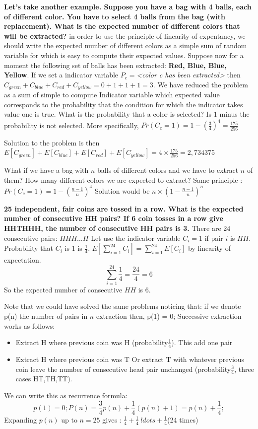 \begin{framed}
\begin{example}
\textbf{Let's take another example. Suppose you have a bag with 4 balls, each  of different color. You have to select 4 balls from the bag (with replacement). What is the expected number of different colors that will be extracted? }
in order to use the principle of linearity of expentancy, we should write the expected number of different colors as a simple sum of random variable for which is easy to compute their expected values.
Suppose now for a moment the following set of balls has been  extracted: \textbf{Red, Blue, Blue, Yellow}. If we set a indicator variable $P_c =$\textit{<color c has been extracted>} then $C_{green} + C_{blue} +C_{red} +C_{yellow} =   0 +1+1+1=3$. We have reduced the problem as a sum of simple to compute Indicator variable which expected value corresponds to the probability that the condition for which the indicator takes value one is true.
What is the probability that a color is selected? Is $1$ minus the probability is not selected.
More specifically, $Pr(C_c=1) = 1 - (\frac{3}{4})^4 = \frac{175}{256}$

Solution to the problem is then $E[C_{green}] + E[C_{blue}] +E[C_{red}] +E[C_{yellow}] = 4 \times \frac{175}{256}= 2,734375$

What if we have a bag with $n$ balls of different colors and we have to extract $n$ of them? How many different colors we are expected to extract?
Same principle : $Pr(C_c=1) = 1 - (\frac{n-1}{n})^4$
Solution would be $n \times (1-\frac{n-1}{n})^n$
\end{example}
\begin{example}
\textbf{25 independent, fair coins are tossed in a row. What is the expected number of consecutive HH pairs? If 6 coin tosses in a row give HHTHHH, the number of consecutive HH pairs is 3.}
There are 24 consecutive pairs: $HHH\ldots H$
Let use the indicator variable $C_i =1 $ if pair $i$ is $HH$. Probability that $C_i$ is $1$ is $\frac{1}{4}$.
$E[\sum_{i=1}^24 C_i] = \sum_{i=1}^24 E[C_i]$  by linearity of expectation.
\[
\sum_{i=1}^{24} \frac{1}{4} = \frac{24}{4} = 6
\]
So the expected number of consecutive $HH$ is 6.

Note that we could have solved the same problems noticing that:
if we denote p(n) the number of pairs in $n$ extraction then, p(1) = 0;
Successive extraction works as follows:

\begin{itemize}
	\item Extract H where previous coin was H (probability$ \frac{1}{4}$). This add one pair
	\item Extract H where previous coin was T Or extract T with whatever previous coin leave the number of consecutive head pair unchanged (probability$ \frac{3}{4}$, three cases HT,TH,TT). 
\end{itemize} 
We can write this as recurrence formula:
\[
	p(1) = 0;
	P(n) = \frac{3}{4}p(n) + \frac{1}{4} (p(n)+1) = p(n) + \frac{1}{4};
\]
Expanding $p(n)$ up to $n=25$ gives : $ \frac{1}{4} + \frac{1}{4} \ ldots + \frac{1}{4} $(24 times)
\end{example}


\end{framed}
